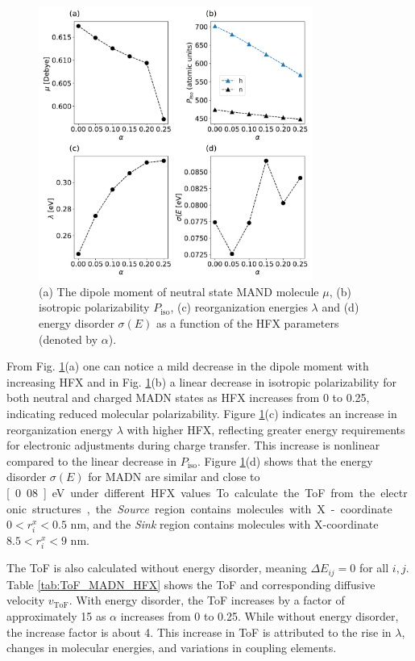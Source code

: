 \documentclass[letterpaper,12pt]{article}
\begin{document}
%
\begin{figure}[H]
    \centering
    \includegraphics[width=0.80\textwidth]{figs/fig_autogen.pdf}
    \caption{(a) The dipole moment of neutral state MAND molecule $\mu$, (b) isotropic polarizability $P_\text{iso}$, (c) reorganization energies $\lambda$ and (d) energy disorder $\sigma(E)$ as a function of the HFX parameters (denoted by $\alpha$).}
    \label{fig:autogen_MADN}
\end{figure}
% 


From Fig. \ref{fig:autogen_MADN}(a) one can notice a mild decrease in the dipole moment with increasing HFX and in Fig. \ref{fig:autogen_MADN}(b) a linear decrease in isotropic polarizability for both neutral and charged MADN states as HFX increases from 0 to 0.25, indicating reduced molecular polarizability.
Figure \ref{fig:autogen_MADN}(c) indicates an increase in reorganization energy $\lambda$ with higher HFX, reflecting greater energy requirements for electronic adjustments during charge transfer. This increase is nonlinear compared to the linear decrease in $P_\text{iso}$.
Figure \ref{fig:autogen_MADN}(d) shows that the energy disorder $\sigma(E)$ for MADN are similar and close to \unit[0.08]{eV} under different HFX values.

To calculate the ToF from the electronic structures, the \textit{Source} region contains molecules with X-coordinate $0 < r^x_i < 0.5$ nm, and the \textit{Sink} region contains molecules with X-coordinate $8.5 < r^x_i < 9$ nm. 

The ToF is also calculated without energy disorder, meaning $\Delta E_{ij}=0$ for all $i,j$.
Table \ref{tab:ToF_MADN_HFX} shows the ToF and corresponding diffusive velocity $v_\text{ToF}$.
With energy disorder, the ToF increases by a factor of approximately 15 as $\alpha$ increases from 0 to 0.25.  
While without energy disorder, the increase factor is about 4. This increase in ToF is attributed to the rise in $\lambda$, changes in molecular energies, and variations in coupling elements.
\end{document}
